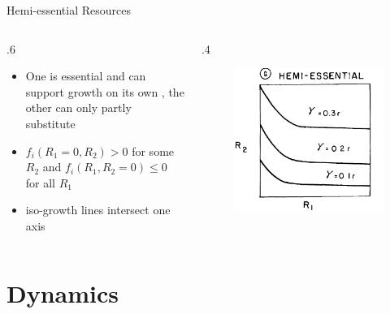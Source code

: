 \documentclass[final,xcolor=dvipsnames]{beamer}
\begin{document}
\begin{frame}{Hemi-essential Resources}
  \begin{columns}
  \begin{column}{.6\framewidth}
   \begin{itemize}
   \item One is essential and can support growth on its own , the other can only partly substitute
   \item $f_i(R_1=0,R_2)> 0$ for some $R_2$ and $f_i(R_1,R_2=0)\leq 0$ for all $R_1$
   \item iso-growth lines intersect one axis
   \end{itemize}
  \end{column}
  \begin{column}{.4\framewidth}
    \begin{figure}
       \includegraphics[width=.4\framewidth]{HemiEssentialA1}
    \end{figure}
  \end{column}
 \end{columns}
\end{frame}


\section{Dynamics}
\end{document}
